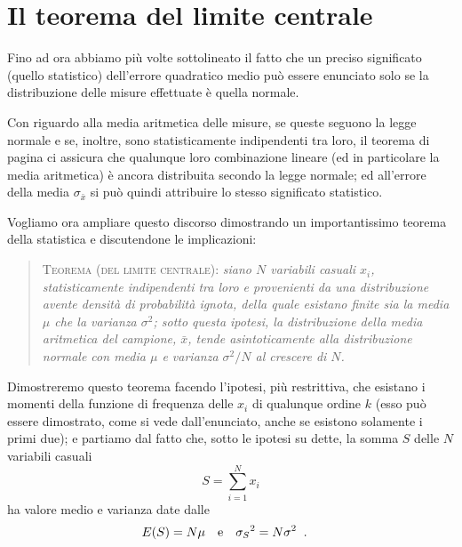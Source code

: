 \section{Il teorema del limite centrale}%
Fino ad ora abbiamo pi\`u volte sottolineato il fatto che un
preciso significato (quello statistico) dell'errore
quadratico medio pu\`o essere enunciato solo se la
distribuzione delle misure effettuate \`e quella normale.

Con riguardo alla media aritmetica delle misure, se queste
seguono la legge normale e se, inoltre, sono statisticamente
indipendenti tra loro, il teorema di pagina
\pageref{th:8.colino} ci assicura che qualunque loro
combinazione lineare (ed in particolare la media aritmetica)
\`e ancora distribuita secondo la legge normale; ed
all'errore della media $\sigma_{\bar x}$ si pu\`o quindi
attribuire lo stesso significato statistico.

Vogliamo ora ampliare questo discorso dimostrando un
importantissimo teorema della statistica e discutendone le
implicazioni:
\begin{quote}
  \textsc{Teorema (del limite centrale):} \textit{siano $N$
    variabili casuali $x_i$, statisticamente indipendenti
    tra loro e provenienti da una distribuzione avente
    densit\`a di probabilit\`a ignota, della quale esistano
    finite sia la media $\mu$ che la varianza $\sigma^2$;
    sotto questa ipotesi, la distribuzione della media
    aritmetica del campione, $\bar x$, tende asintoticamente
    alla distribuzione normale con media $\mu$ e varianza
    $\sigma^2/N$ al crescere di $N$.}
\end{quote}

Dimostreremo questo teorema facendo l'ipotesi, pi\`u
restrittiva, che esistano i momenti della funzione di
frequenza delle $x_i$ di qualunque ordine $k$ (esso pu\`o
essere dimostrato, come si vede dall'enunciato, anche se
esistono solamente i primi due); e partiamo dal fatto che,
sotto le ipotesi su dette, la somma $S$ delle $N$ variabili
casuali
\begin{equation*}
  S = \sum_{i=1}^N x_i
\end{equation*}
ha valore medio e varianza date dalle
\begin{align*}
  E(S) &= N \mu &&\text{e} & {\sigma_S}^2 &= N \sigma^2 \;\;
    .
\end{align*}

